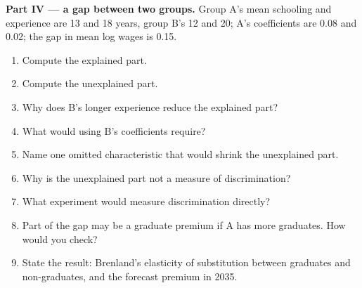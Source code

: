 \begin{problem}
\medskip\noindent\textbf{Part IV --- a gap between two groups.} Group A's mean schooling
and experience are 13 and 18 years, group B's 12 and 20; A's coefficients are 0.08 and
0.02; the gap in mean log wages is 0.15.
\begin{enumerate}[resume]
\item Compute the explained part.
\item Compute the unexplained part.
\item Why does B's longer experience reduce the explained part?
\item What would using B's coefficients require?
\item Name one omitted characteristic that would shrink the unexplained part.
\item Why is the unexplained part not a measure of discrimination?
\item What experiment would measure discrimination directly?
\item Part of the gap may be a graduate premium if A has more graduates. How would you
check?
\item State the result: Brenland's elasticity of substitution between graduates and
non-graduates, and the forecast premium in 2035.
\end{enumerate}
\end{problem}
